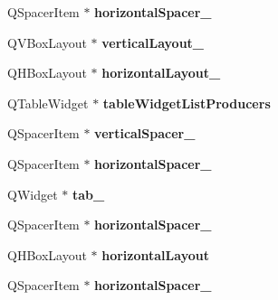 \begin{DoxyCompactItemize}
\item 
\hypertarget{classUi__MainWindow_a3202b80ffde7629da626c1e0994f63f5}{Q\-Spacer\-Item $\ast$ {\bfseries horizontal\-Spacer\-\_}}\label{classUi__MainWindow_a3202b80ffde7629da626c1e0994f63f5}

\item 
\hypertarget{classUi__MainWindow_afcc20a3d5058037a00cdc6122f231848}{Q\-V\-Box\-Layout $\ast$ {\bfseries vertical\-Layout\-\_}}\label{classUi__MainWindow_afcc20a3d5058037a00cdc6122f231848}

\item 
\hypertarget{classUi__MainWindow_ae183387a7d233b437a637b403ba39ffd}{Q\-H\-Box\-Layout $\ast$ {\bfseries horizontal\-Layout\-\_}}\label{classUi__MainWindow_ae183387a7d233b437a637b403ba39ffd}

\item 
\hypertarget{classUi__MainWindow_adf87bb296d47805dd229fe18d83add84}{Q\-Table\-Widget $\ast$ {\bfseries table\-Widget\-List\-Producers}}\label{classUi__MainWindow_adf87bb296d47805dd229fe18d83add84}

\item 
\hypertarget{classUi__MainWindow_adc1f5fdd97fb3729999c56902d0fa591}{Q\-Spacer\-Item $\ast$ {\bfseries vertical\-Spacer\-\_}}\label{classUi__MainWindow_adc1f5fdd97fb3729999c56902d0fa591}

\item 
\hypertarget{classUi__MainWindow_a71605bcf74c938f64207451850fc69b1}{Q\-Spacer\-Item $\ast$ {\bfseries horizontal\-Spacer\-\_}}\label{classUi__MainWindow_a71605bcf74c938f64207451850fc69b1}

\item 
\hypertarget{classUi__MainWindow_a83495b23cbc6810f81978dc0d584b810}{Q\-Widget $\ast$ {\bfseries tab\-\_}}\label{classUi__MainWindow_a83495b23cbc6810f81978dc0d584b810}

\item 
\hypertarget{classUi__MainWindow_a9a022556cf8ce3fa47e51d79cb222ab0}{Q\-Spacer\-Item $\ast$ {\bfseries horizontal\-Spacer\-\_}}\label{classUi__MainWindow_a9a022556cf8ce3fa47e51d79cb222ab0}

\item 
\hypertarget{classUi__MainWindow_acd6fdc9ebacc4b25b834162380d75ce8}{Q\-H\-Box\-Layout $\ast$ {\bfseries horizontal\-Layout}}\label{classUi__MainWindow_acd6fdc9ebacc4b25b834162380d75ce8}

\item 
\hypertarget{classUi__MainWindow_a4fc05b11984637298795a354792c4023}{Q\-Spacer\-Item $\ast$ {\bfseries horizontal\-Spacer\-\_}}\label{classUi__MainWindow_a4fc05b11984637298795a354792c4023}


\end{DoxyCompactItemize}
